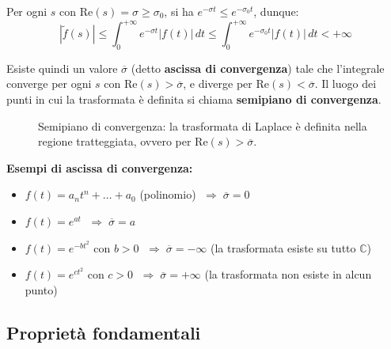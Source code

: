 Per ogni $s$ con $\text{Re}(s) = \sigma \geq \sigma_0$, si ha $e^{-\sigma t} \leq e^{-\sigma_0 t}$, dunque:
\[
    |\tilde{f}(s)| \leq \int_0^{+\infty} e^{-\sigma t} |f(t)| \, dt \leq \int_0^{+\infty} e^{-\sigma_0 t} |f(t)| \, dt < +\infty
\]

Esiste quindi un valore $\overline{\sigma}$ (detto \textbf{ascissa di convergenza}) tale che l'integrale converge per ogni $s$ con $\text{Re}(s) > \overline{\sigma}$, e diverge per $\text{Re}(s) < \overline{\sigma}$. Il luogo dei punti in cui la trasformata è definita si chiama \textbf{semipiano di convergenza}.

\begin{figure}[H]
    \centering
    \caption{Semipiano di convergenza: la trasformata di Laplace è definita nella regione tratteggiata, ovvero per $\text{Re}(s) > \overline{\sigma}$.}
\end{figure}

\vspace{0.3em}
\noindent\textbf{Esempi di ascissa di convergenza:}
\begin{itemize}
    \item $f(t) = a_n t^n + \dots + a_0$ (polinomio) $\;\Rightarrow\; \overline{\sigma} = 0$
    \item $f(t) = e^{at}$ $\;\Rightarrow\; \overline{\sigma} = a$
    \item $f(t) = e^{-bt^2}$ con $b > 0$ $\;\Rightarrow\; \overline{\sigma} = -\infty$ (la trasformata esiste su tutto $\mathbb{C}$)
    \item $f(t) = e^{ct^2}$ con $c > 0$ $\;\Rightarrow\; \overline{\sigma} = +\infty$ (la trasformata non esiste in alcun punto)
\end{itemize}

\subsection{Proprietà fondamentali}

